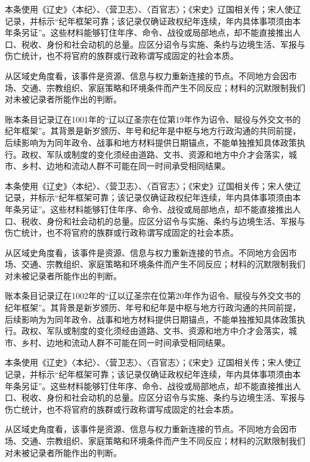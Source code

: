 本条使用《辽史》〈本纪〉、〈营卫志〉、〈百官志〉；《宋史》辽国相关传；宋人使辽记录，并标示“纪年框架可靠；该记录仅确证政权纪年连续，年内具体事项须由本年条另证”。这些材料能够钉住年序、命令、战役或局部地点，却不能直接推出人口、税收、身份和社会动机的总量。应区分诏令与实施、条约与边境生活、军报与伤亡统计，也不将官府的族群或行政称谓写成固定的社会本质。

从区域史角度看，该事件是资源、信息与权力重新连接的节点。不同地方会因市场、交通、宗教组织、家庭策略和环境条件而产生不同反应；材料的沉默限制我们对未被记录者所能作出的判断。

账本条目记录辽在1001年的“辽以辽圣宗在位第19年作为诏令、赋役与外交文书的纪年框架”。其背景是新岁颁历、年号和纪年是中枢与地方行政沟通的共同前提，后续影响为为同年政令、战事和地方材料提供日期锚点，不能单独推知具体政策执行。政权、军队或制度的变化须经由道路、文书、资源和地方中介才会落实，城市、乡村、边地和流动人群不可能在同一时间承受相同结果。

本条使用《辽史》〈本纪〉、〈营卫志〉、〈百官志〉；《宋史》辽国相关传；宋人使辽记录，并标示“纪年框架可靠；该记录仅确证政权纪年连续，年内具体事项须由本年条另证”。这些材料能够钉住年序、命令、战役或局部地点，却不能直接推出人口、税收、身份和社会动机的总量。应区分诏令与实施、条约与边境生活、军报与伤亡统计，也不将官府的族群或行政称谓写成固定的社会本质。

从区域史角度看，该事件是资源、信息与权力重新连接的节点。不同地方会因市场、交通、宗教组织、家庭策略和环境条件而产生不同反应；材料的沉默限制我们对未被记录者所能作出的判断。

账本条目记录辽在1002年的“辽以辽圣宗在位第20年作为诏令、赋役与外交文书的纪年框架”。其背景是新岁颁历、年号和纪年是中枢与地方行政沟通的共同前提，后续影响为为同年政令、战事和地方材料提供日期锚点，不能单独推知具体政策执行。政权、军队或制度的变化须经由道路、文书、资源和地方中介才会落实，城市、乡村、边地和流动人群不可能在同一时间承受相同结果。

本条使用《辽史》〈本纪〉、〈营卫志〉、〈百官志〉；《宋史》辽国相关传；宋人使辽记录，并标示“纪年框架可靠；该记录仅确证政权纪年连续，年内具体事项须由本年条另证”。这些材料能够钉住年序、命令、战役或局部地点，却不能直接推出人口、税收、身份和社会动机的总量。应区分诏令与实施、条约与边境生活、军报与伤亡统计，也不将官府的族群或行政称谓写成固定的社会本质。

从区域史角度看，该事件是资源、信息与权力重新连接的节点。不同地方会因市场、交通、宗教组织、家庭策略和环境条件而产生不同反应；材料的沉默限制我们对未被记录者所能作出的判断。

